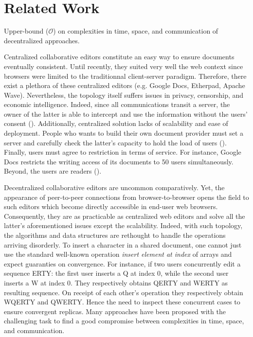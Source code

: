 \section{Related Work}
\label{sec:relatedwork}

\begin{table*}
  \centering
  
  \caption{\label{table:complexities}Upper-bound ($\mathcal{O}$) on complexities in time, space, and communication of decentralized approaches.}
\end{table*}

\begin{asparadesc}

\item[Centralized] collaborative editors constitute an easy way to ensure
  documents eventually consistent. Until recently, they suited very well the web
  context since browsers were limited to the traditionnal client-server
  paradigm. Therefore, there exist a plethora of these centralized editors
  (e.g. Google Docs, Etherpad, Apache Wave).  Nevertheless, the topology itself
  suffers issues in privacy, censorship, and economic intelligence.  Indeed,
  since all communications transit a server, the owner of the latter is able to
  intercept and use the information without the users' consent ().
  Additionally, centralized solution lacks of scalability and ease of
  deployment. People who wants to build their own document provider must set a
  server and carefully check the latter's capacity to hold the load of users
  ().  Finally, users must agree to restriction in terms of service.
  For instance, Google Docs restricts the writing access of its documents to 50
  users simultaneously. Beyond, the users are readers (). 
\item[Decentralized] collaborative editors are uncommon comparatively. Yet, the
  appearance of peer-to-peer connections from browser-to-browser opens the field
  to such editors which become directly accessible in end-user web
  browsers. Consequently, they are as practicable as centralized web editors and
  solve all the latter's aforementioned issues except the scalability. Indeed,
  with such topology, the algorithms and data structures are rethought to handle
  the operations arriving disorderly.  To insert a character in a shared
  document, one cannot just use the standard well-known operation \emph{insert
    element at index} of arrays and expect guaranties on convergence. For
  instance, if two users concurrently edit a sequence ERTY: the first user
  inserts a Q at index 0, while the second user inserts a W at index 0. They
  respectively obtains QERTY and WERTY as resulting sequence. On receipt of each
  other's operation they respectively obtain WQERTY and QWERTY. Hence the need
  to inspect these concurrent cases to ensure convergent replicas.  Many
  approaches have been proposed with the challenging task to find a good
  compromise between complexities in time, space, and communication.

\end{asparadesc}

